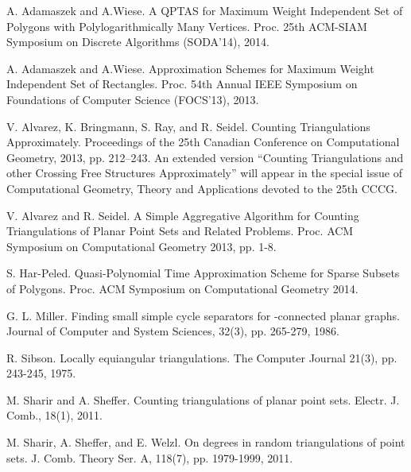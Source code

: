 \documentclass[a4paper]{article}
\begin{document}
{\small
\begin{thebibliography}{10}
A. Adamaszek and A.Wiese.
\newblock
 A QPTAS for Maximum Weight Independent Set of
 Polygons with Polylogarithmically Many Vertices.
\newblock 
Proc. 25th ACM-SIAM Symposium on Discrete Algorithms
(SODA'14), 2014.

A. Adamaszek and A.Wiese.
\newblock
Approximation Schemes for Maximum Weight Independent Set of
 Rectangles.
\newblock 
Proc. 54th Annual IEEE Symposium on Foundations of Computer Science
(FOCS'13), 2013.

V. Alvarez, K. Bringmann, S. Ray, and R. Seidel.
\newblock
Counting Triangulations Approximately.
\newblock
Proceedings of the 25th Canadian Conference on
Computational Geometry, 2013,
pp. 212--243. An extended version ``Counting Triangulations
and other Crossing Free Structures Approximately'' will
appear in the special issue of Computational Geometry, Theory
and Applications devoted to the 25th CCCG.

V. Alvarez and R. Seidel.
\newblock
A Simple Aggregative Algorithm for
Counting Triangulations of Planar Point Sets and
Related Problems.
\newblock
Proc. ACM Symposium on Computational Geometry 2013, pp. 1-8.

S. Har-Peled.
\newblock
Quasi-Polynomial Time Approximation Scheme for
Sparse Subsets of Polygons.
\newblock
Proc. ACM Symposium on Computational Geometry 2014.

G. L. Miller.
\newblock
Finding small simple cycle separators for -connected
planar graphs.
\newblock
Journal of Computer and System Sciences, 32(3), pp. 265-279,
1986.  

R. Sibson.
\newblock
Locally equiangular triangulations.
\newblock
The Computer Journal 21(3), pp. 243-245, 1975.


M. Sharir and A. Sheffer.
\newblock
Counting triangulations of planar point sets.
\newblock
Electr. J. Comb., 18(1), 2011.

M. Sharir, A. Sheffer, and E. Welzl.
\newblock
On degrees in random triangulations of point sets.
\newblock
J. Comb. Theory Ser. A, 118(7), pp. 1979-1999, 2011.
\end{thebibliography}}
\end{document}
